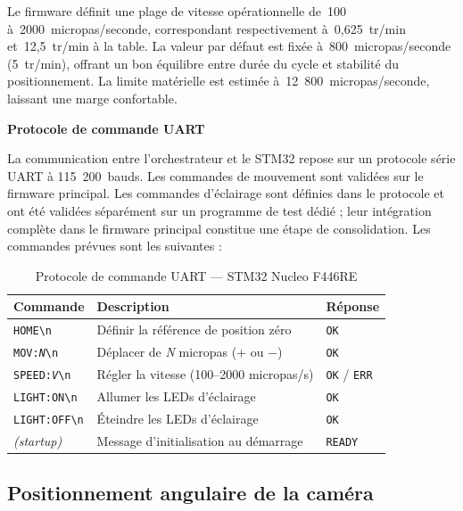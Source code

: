 Le firmware définit une plage de vitesse opérationnelle de~100 à~2000~micropas/seconde,
correspondant respectivement à~0,625~tr/min et~12,5~tr/min à la table. La valeur par défaut
est fixée à~800~micropas/seconde (5~tr/min), offrant un bon équilibre entre durée du cycle
et stabilité du positionnement. La limite matérielle est estimée à~12~800~micropas/seconde,
laissant une marge confortable.

\medskip
\noindent\textbf{Protocole de commande UART}

La communication entre l'orchestrateur et le STM32 repose sur un protocole série UART à
115~200~bauds. Les commandes de mouvement sont validées sur le firmware principal. Les
commandes d'éclairage sont définies dans le protocole et ont été validées séparément sur un
programme de test dédié ; leur intégration complète dans le firmware principal constitue une
étape de consolidation. Les commandes prévues sont les suivantes :

\begin{table}[htbp]
\caption{Protocole de commande UART — STM32 Nucleo F446RE}
\label{tab:uart_protocol}
\centering
\small
\renewcommand{\arraystretch}{1.4}
\begin{tabular}{|l|l|l|}
\hline
\rowcolor{navyblue}
\textbf{\color{white}Commande} & \textbf{\color{white}Description} & \textbf{\color{white}Réponse} \\
\hline
\texttt{HOME\textbackslash n} & Définir la référence de position zéro & \texttt{OK} \\
\hline
\texttt{MOV:\textit{N}\textbackslash n} & Déplacer de \textit{N} micropas (+ ou $-$) & \texttt{OK} \\
\hline
\texttt{SPEED:\textit{V}\textbackslash n} & Régler la vitesse (100–2000 micropas/s) & \texttt{OK} / \texttt{ERR} \\
\hline
\texttt{LIGHT:ON\textbackslash n} & Allumer les LEDs d'éclairage & \texttt{OK} \\
\hline
\texttt{LIGHT:OFF\textbackslash n} & Éteindre les LEDs d'éclairage & \texttt{OK} \\
\hline
\textit{(startup)} & Message d'initialisation au démarrage & \texttt{READY} \\
\hline
\end{tabular}
\end{table}

\subsection{Positionnement angulaire de la caméra}

